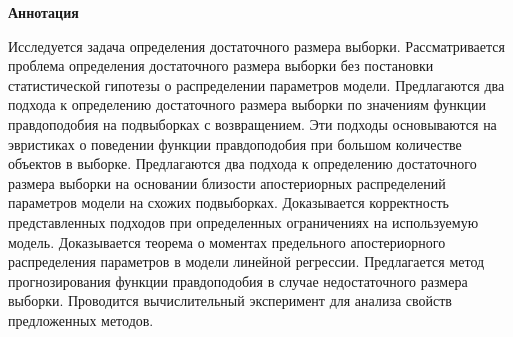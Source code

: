 \begin{center}
    \Large{\textbf{Аннотация}}
\end{center}

Исследуется задача определения достаточного размера выборки. Рассматривается проблема определения достаточного размера выборки без постановки статистической гипотезы о распределении параметров модели. Предлагаются два подхода к определению достаточного размера выборки по значениям функции правдоподобия на подвыборках с возвращением. Эти подходы основываются на эвристиках о поведении функции правдоподобия при большом количестве объектов в выборке. Предлагаются два подхода к определению достаточного размера выборки на основании близости апостериорных распределений параметров модели на схожих подвыборках. Доказывается корректность представленных подходов при определенных ограничениях на используемую модель. Доказывается теорема о моментах предельного апостериорного распределения параметров в модели линейной регрессии. Предлагается метод прогнозирования функции правдоподобия в случае недостаточного размера выборки. Проводится вычислительный эксперимент для анализа свойств предложенных методов.